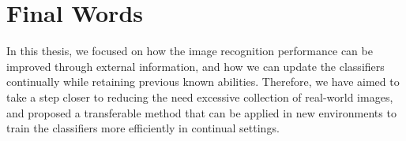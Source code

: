 \section{Final Words}\label{chap5:sec:final_words}

In this thesis, we focused on how the image recognition performance can be improved through external information, and how we can update the classifiers continually while retaining previous known abilities. Therefore, we have aimed to take a step closer to reducing the need excessive collection of real-world images, and proposed a transferable method that can be applied in new environments to train the classifiers more efficiently in continual settings. 









